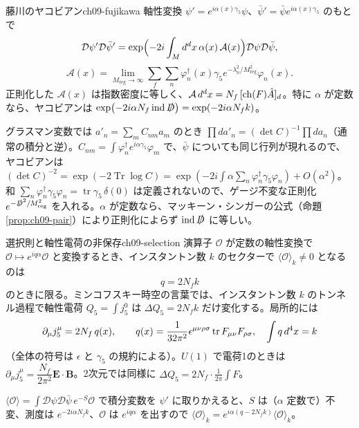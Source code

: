 \begin{mythm}{藤川のヤコビアン}{ch09-fujikawa}
軸性変換 $\psi'=e^{i\alpha(x)\gamma_5}\psi$、$\bar\psi'=\bar\psi e^{i\alpha(x)\gamma_5}$ のもとで
\[
\mathcal D\psi'\mathcal D\bar\psi'=\exp\Bigl(-2i\int_Md^dx\,\alpha(x)\,\mathcal A(x)\Bigr)\mathcal D\psi\mathcal D\bar\psi,
\]
\[
\mathcal A(x)=\lim_{M_{\mathrm{reg}}\to\infty}\sum_{f}\sum_n\varphi_n^\dagger(x)\gamma_5e^{-\lambda_n^2/M_{\mathrm{reg}}^2}\varphi_n(x).
\]
正則化した $\mathcal A(x)$ は指数密度に等しく、$\mathcal A\,d^dx=N_f\,[\operatorname{ch}(F)\hat{A}]_d$。特に $\alpha$ が定数なら、ヤコビアンは $\exp(-2i\alpha N_f\operatorname{ind}\slashed D)=\exp(-2i\alpha N_fk)$。
\end{mythm}
\begin{note}
グラスマン変数では $a'_n=\sum_mC_{nm}a_m$ のとき $\prod da'_n=(\det C)^{-1}\prod da_n$（通常の積分と逆）。$C_{nm}=\int\varphi_n^\dagger e^{i\alpha\gamma_5}\varphi_m$ で、$\bar\psi$ についても同じ行列が現れるので、ヤコビアンは $(\det C)^{-2}=\exp(-2\operatorname{Tr}\log C)=\exp(-2i\int\alpha\sum_n\varphi_n^\dagger\gamma_5\varphi_n)+O(\alpha^2)$。和 $\sum_n\varphi_n^\dagger\gamma_5\varphi_n=\operatorname{tr}\gamma_5\,\delta(0)$ は定義されないので、ゲージ不変な正則化 $e^{-\slashed D^2/M_{\mathrm{reg}}^2}$ を入れる。$\alpha$ が定数なら、マッキーン・シンガーの公式（命題 \ref{prop:ch09-pair}）により正則化によらず $\operatorname{ind}\slashed D$ に等しい。
\end{note}

\begin{myprop}{選択則と軸性電荷の非保存}{ch09-selection}
演算子 $\mathcal O$ が定数の軸性変換で $\mathcal O\mapsto e^{iq\alpha}\mathcal O$ と変換するとき、インスタントン数 $k$ のセクターで $\langle\mathcal O\rangle_k\neq0$ となるのは
\[
q=2N_fk
\]
のときに限る。ミンコフスキー時空の言葉では、インスタントン数 $k$ のトンネル過程で軸性電荷 $Q_5=\int j_5^0$ は $\Delta Q_5=2N_fk$ だけ変化する。局所的には
\[
\partial_\mu j_5^\mu=2N_f\,q(x),\qquad q(x)=\frac{1}{32\pi^2}\epsilon^{\mu\nu\rho\sigma}\tr F_{\mu\nu}F_{\rho\sigma},\quad\int q\,d^4x=k
\]
（全体の符号は $\epsilon$ と $\gamma_5$ の規約による）。$U(1)$ で電荷1のときは $\partial_\mu j_5^\mu=\dfrac{N_f}{2\pi^2}\bm E\cdot\bm B$。2次元では同様に $\Delta Q_5=2N_f\cdot\frac{1}{2\pi}\int F$。
\end{myprop}
\begin{note}
$\langle\mathcal O\rangle=\int\mathcal D\psi\mathcal D\bar\psi\,e^{-S}\mathcal O$ で積分変数を $\psi'$ に取りかえると、$S$ は（$\alpha$ 定数で）不変、測度は $e^{-2i\alpha N_fk}$、$\mathcal O$ は $e^{iq\alpha}$ を出すので $\langle\mathcal O\rangle_k=e^{i\alpha(q-2N_fk)}\langle\mathcal O\rangle_k$。
\end{note}


